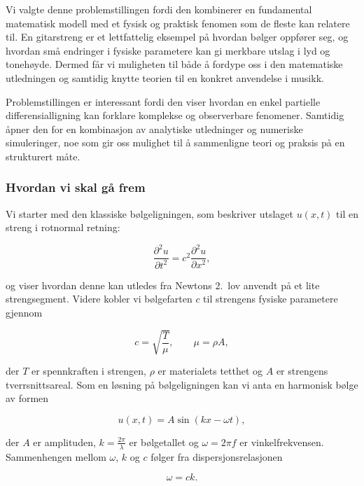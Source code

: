 Vi valgte denne problemstillingen fordi den kombinerer en fundamental matematisk modell 
med et fysisk og praktisk fenomen som de fleste kan relatere til. En gitarstreng er et lettfattelig
eksempel på hvordan bølger oppfører seg, og hvordan små endringer i fysiske parametere kan gi 
merkbare utslag i lyd og tonehøyde. Dermed får vi muligheten til både å fordype oss i 
den matematiske utledningen og samtidig knytte teorien til en konkret anvendelse i musikk.

Problemstillingen er interessant fordi den viser hvordan en enkel partielle differensialligning 
kan forklare komplekse og observerbare fenomener. Samtidig åpner den for en kombinasjon 
av analytiske utledninger og numeriske simuleringer, noe som gir oss mulighet til å sammenligne 
teori og praksis på en strukturert måte.

\subsubsection*{Hvordan vi skal gå frem}

Vi starter med den klassiske bølgeligningen, som beskriver utslaget $u(x,t)$ til en streng i rotnormal retning:

\begin{equation*}
  \frac{\partial^2 u}{\partial t^2} = c^2 \frac{\partial^2 u}{\partial x^2},
  \label{eq:bolgeligningen}
\end{equation*}

og viser hvordan denne kan utledes fra Newtons 2.~lov anvendt på et lite strengsegment.
Videre kobler vi bølgefarten $c$ til strengens fysiske parametere gjennom

\begin{equation*}
  c = \sqrt{\frac{T}{\mu}}, \qquad \mu = \rho A,
\end{equation*}

der $T$ er spennkraften i strengen, $\rho$ er materialets tetthet og $A$ er strengens tverrsnittsareal.
Som en løsning på bølgeligningen kan vi anta en harmonisk bølge av formen

\begin{equation*}
  u(x,t) = A \sin(kx - \omega t),
\end{equation*}

der $A$ er amplituden, $k=\tfrac{2\pi}{\lambda}$ er bølgetallet og $\omega = 2\pi f$ er vinkelfrekvensen.  
Sammenhengen mellom $\omega$, $k$ og $c$ følger fra dispersjonsrelasjonen

\begin{equation*}
  \omega = c k.
\end{equation*}

